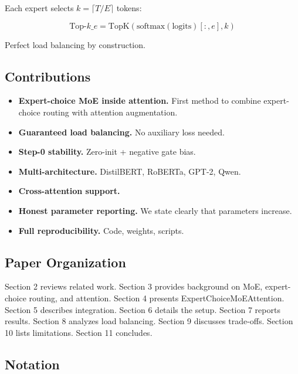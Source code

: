 Each expert selects $k = \lceil T / E \rceil$ tokens:

\[
\text{Top-}k\_e = \text{TopK}\!\left(\text{softmax}(\text{logits})[:, e], k\right)
\tag{1.6}
\]

Perfect load balancing by construction.

\subsection{Contributions}

\begin{itemize}
\item \textbf{Expert-choice MoE inside attention.} First method to combine expert-
  choice routing with attention augmentation.
\item \textbf{Guaranteed load balancing.} No auxiliary loss needed.
\item \textbf{Step-0 stability.} Zero-init + negative gate bias.
\item \textbf{Multi-architecture.} DistilBERT, RoBERTa, GPT-2, Qwen.
\item \textbf{Cross-attention support.}
\item \textbf{Honest parameter reporting.} We state clearly that parameters increase.
\item \textbf{Full reproducibility.} Code, weights, scripts.

\end{itemize}
\subsection{Paper Organization}

Section 2 reviews related work. Section 3 provides background on MoE, 
expert-choice routing, and attention. Section 4 presents 
ExpertChoiceMoEAttention. Section 5 describes integration. Section 6 details 
the setup. Section 7 reports results. Section 8 analyzes load balancing. 
Section 9 discusses trade-offs. Section 10 lists limitations. Section 11 
concludes.



\subsection{Notation}

